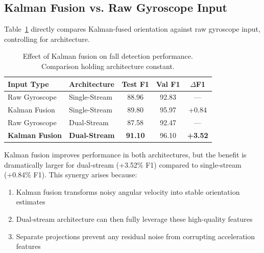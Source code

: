 \subsection{Kalman Fusion vs. Raw Gyroscope Input}
\label{subsec:kalman_vs_raw}

Table~\ref{tab:kalman_vs_raw} directly compares Kalman-fused orientation against raw gyroscope input, controlling for architecture.

\begin{table}[H]
\caption{Effect of Kalman fusion on fall detection performance. Comparison holding architecture constant.}
\label{tab:kalman_vs_raw}
\centering
\begin{tabular}{llccc}
\toprule
\textbf{Input Type} & \textbf{Architecture} & \textbf{Test F1} & \textbf{Val F1} & \textbf{$\Delta$F1} \\
\midrule
Raw Gyroscope & Single-Stream & 88.96 & 92.83 & --- \\
Kalman Fusion & Single-Stream & 89.80 & 95.97 & +0.84 \\
\midrule
Raw Gyroscope & Dual-Stream & 87.58 & 92.47 & --- \\
\textbf{Kalman Fusion} & \textbf{Dual-Stream} & \textbf{91.10} & 96.10 & \textbf{+3.52} \\
\bottomrule
\end{tabular}
\end{table}

Kalman fusion improves performance in both architectures, but the benefit is dramatically larger for dual-stream (+3.52\% F1) compared to single-stream (+0.84\% F1). This synergy arises because:

\begin{enumerate}
    \item Kalman fusion transforms noisy angular velocity into stable orientation estimates
    \item Dual-stream architecture can then fully leverage these high-quality features
    \item Separate projections prevent any residual noise from corrupting acceleration features
\end{enumerate}

